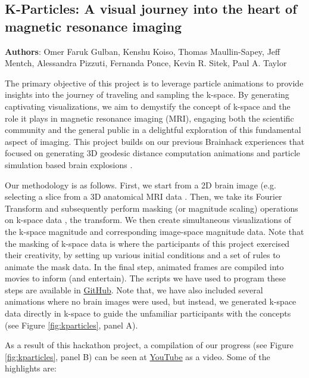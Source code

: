 \documentclass{article}
\begin{document}
\subsection{K-Particles: A visual journey into the heart of magnetic resonance imaging}
\textbf{Authors}: Omer Faruk Gulban, Kenshu Koiso, Thomas Maullin-Sapey, Jeff Mentch, Alessandra Pizzuti, Fernanda Ponce, Kevin R. Sitek, Paul A. Taylor

The primary objective of this project is to leverage particle animations to provide insights into the journey of traveling and sampling the k-space. By generating captivating visualizations, we aim to demystify the concept of k-space and the role it plays in magnetic resonance imaging (MRI), engaging both the scientific community and the general public in a delightful exploration of this fundamental aspect of imaging. This project builds on our previous Brainhack experiences that focused on generating 3D geodesic distance computation animations \cite{Brainhack2021} and particle simulation based brain explosions \cite{Moia2024}.

Our methodology is as follows. First, we start from a 2D brain image (e.g. selecting a slice from a 3D anatomical MRI data 
\cite{Brett2023-ia,Numpy,Scipy}. Then, we take its Fourier Transform and subsequently perform masking (or magnitude scaling) operations on k-space data \cite{Bernstein2004}, the transform. We then create simultaneous visualizations of the k-space magnitude and corresponding image-space magnitude data. Note that the masking of k-space data is where the participants of this project exercised their creativity, by setting up various initial conditions and a set of rules to animate the mask data. In the final step, animated frames are compiled into movies to inform (and entertain). The scripts we have used to program these steps are available in \href{https://github.com/ofgulban/k_particles}{GitHub}. Note that, we have also included several animations where no brain images were used, but instead, we generated k-space data directly in k-space to guide the unfamiliar participants with the concepts (see Figure \ref{fig:kparticles}, panel A).

As a result of this hackathon project, a compilation of our progress (see Figure \ref{fig:kparticles}, panel B) can be seen at \href{https://youtu.be/_5ZDctWv5X4}{YouTube} as a video. Some of the highlights are:
\end{document}
